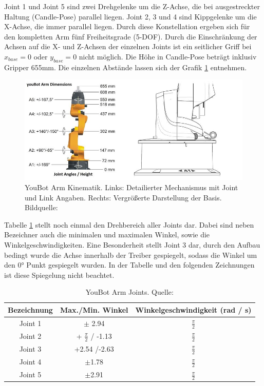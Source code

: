 Joint 1 und Joint 5 sind zwei Drehgelenke um die Z-Achse, die bei ausgestreckter Haltung (Candle-Pose) parallel liegen. Joint 2, 3 und 4 sind Kippgelenke um die X-Achse, die immer parallel liegen. Durch diese Konstellation ergeben sich für den kompletten Arm fünf Freiheitsgrade (5-DOF). Durch die Einschränkung der Achsen auf die X- und Z-Achsen der einzelnen Joints ist ein seitlicher Griff bei $x_{base} = 0$ oder $y_{base} = 0$ nicht möglich. Die Höhe in Candle-Pose beträgt inklusiv Gripper 655mm. Die einzelnen Abstände lassen sich der Grafik \ref{fig:basic-aufbau-youbot-kinematik} entnehmen.

\begin{figure}[H]
	\centering
	\includegraphics[scale=0.8]{fig/kukaarm_1}   
	\caption[YouBot Arm Kinematik]{YouBot Arm Kinematik. Links: Detailierter Mechanismus mit Joint und Link Angaben. Rechts: Vergrößerte Darstellung der Basis. Bildquelle: \cite{monikaflorekjasinska2015}}
	\label{fig:basic-aufbau-youbot-kinematik}
\end{figure}



 
 Tabelle \ref{tab:basic-aufbau-youbot-joints} stellt noch einmal den Drehbereich aller Joints dar. Dabei sind neben Bezeichner auch die minimalen und maximalen Winkel, sowie die Winkelgeschwindigkeiten. Eine Besonderheit stellt Joint 3 dar, durch den Aufbau bedingt wurde die Achse innerhalb der Treiber gespiegelt, sodass die Winkel um den 0° Punkt gespiegelt wurden. In der Tabelle und den folgenden Zeichnungen ist diese Spiegelung nicht beachtet.
 
   \begin{table}[H]
   	\begin{tabular}{|c|c|c|}
   		\hline Bezeichnung & Max./Min. Winkel & Winkelgeschwindigkeit (rad / s) \\ 
   		\hline Joint 1 & $\pm$ 2.94 & $\frac{\pi}{2}$  \\ 
   		\hline Joint 2 & + $\frac{\pi}{2}$ / -1.13  & $\frac{\pi}{2}$ \\ 
   		\hline Joint 3 & +2.54 /-2.63 & $\frac{\pi}{2}$ \\ 
   		\hline Joint 4 & $\pm$1.78 & $\frac{\pi}{2}$ \\ 
   		\hline Joint 5 & $\pm$2.91 & $\frac{\pi}{2}$ \\ 
   		\hline 
   	\end{tabular}
   	\caption[YouBot Arm Joints]{YouBot Arm Joints. Quelle: \cite{monikaflorekjasinska2015}}
   	\label{tab:basic-aufbau-youbot-joints}
   \end{table}
   
